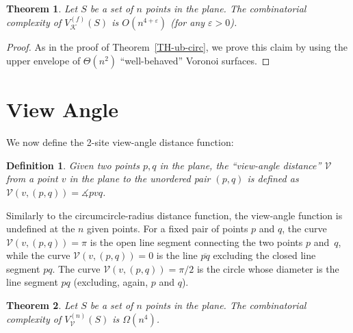 \documentclass[10pt, conference, compsocconf]{IEEEtran}
\newtheorem{theorem}{Theorem}
\newtheorem{definition}{Definition}
\def\K{{\mathcal K}}
\def\V{{\mathcal V}}
\newcommand{\eps}{\varepsilon}
\begin{document}
\begin{theorem}
   Let $S$ be a set of $n$ points in the plane.
   The combinatorial complexity of $V_\K^{(f)}(S)$ is $O(n^{4+\eps})$
   (for any $\eps > 0$).
\end{theorem}

\begin{proof}
   As in the proof of Theorem~\ref{TH-ub-circ},
   we prove this claim by using the upper envelope of $\Theta(n^2)$
   ``well-behaved'' Voronoi surfaces.
\end{proof}



\section{View Angle}

\label{S-angle}

We now define the 2-site view-angle distance function:
\begin{definition}
   Given two points $p,q$ in the plane, the ``view-angle distance''
   $\V$ from a point $v$ in the plane to the unordered pair $(p,q)$ is
   defined as $\V(v,(p,q)) = \measuredangle{pvq}$.
\end{definition}
Similarly to the circumcircle-radius distance function, the view-angle
function is undefined at the $n$ given points.  For a fixed pair of
points $p$ and $q$, the curve $\V(v,(p,q)) = \pi$ is the open line
segment connecting the two points $p$ and~$q$, while the curve
$\V(v,(p,q)) = 0$ is the line $\overline{pq}$ excluding
the closed line segment $pq$.  The curve
$\V(v,(p,q)) = \pi/2$ is the circle whose diameter is the line
segment $pq$ (excluding, again, $p$ and $q$).

\begin{theorem}
   Let $S$ be a set of $n$ points in the plane.
   The combinatorial complexity of $V_\V^{(n)}(S)$ is $\Omega(n^4)$.
\end{theorem}
\end{document}
